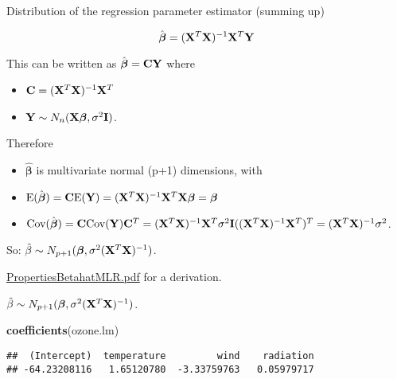 \documentclass[ignorenonframetext,]{beamer}
\newenvironment{Shaded}{\begin{snugshade}}{\end{snugshade}}
\newcommand{\KeywordTok}[1]{\textcolor[rgb]{0.13,0.29,0.53}{\textbf{#1}}}
\newcommand{\NormalTok}[1]{#1}
\providecommand{\tightlist}{%
  \setlength{\itemsep}{0pt}\setlength{\parskip}{0pt}}
\begin{document}
\begin{frame}[fragile]

\begin{block}{Distribution of the regression parameter estimator
(summing up)}

\[ \hat{\boldsymbol\beta}=({\bf X}^T{\bf X})^{-1} {\bf X}^T {\bf Y}\]

This can be written as \(\hat{\boldsymbol\beta}={\bf C}{\bf Y}\) where

\begin{itemize}
\tightlist
\item
  \({\bf C}=({\bf X}^T{\bf X})^{-1} {\bf X}^T\)
\item
  \({\bf Y} \sim N_{n}({\bf X} {\boldsymbol\beta},\sigma^2 {\bf I})\).
\end{itemize}

Therefore

\begin{itemize}
\tightlist
\item
  \(\hat{\boldsymbol\beta}\) is multivariate normal (p+1) dimensions,
  with
\item
  \(\text{E}(\hat{\boldsymbol\beta})={\bf C}\text{E}({\bf Y})=({\bf X}^T{\bf X})^{-1} {\bf X}^T{\bf X} {\boldsymbol\beta}={\boldsymbol\beta}\)
\item
  \(\text{Cov}(\hat{\boldsymbol\beta})={\bf C}\text{Cov}({\bf Y}){\bf C}^T=({\bf X}^T{\bf X})^{-1} {\bf X}^T \sigma^2 {\bf I}(({\bf X}^T{\bf X})^{-1} {\bf X}^T)^T =({\bf X}^T{\bf X})^{-1} \sigma^2\).
\end{itemize}

So:
\(\hat{\beta}\sim N_{p+1}(\boldsymbol{\beta},\sigma^2({\bf X}^T{\bf X})^{-1})\).

\end{block}

\begin{block}{\href{https://www.math.ntnu.no/emner/TMA4268/2018v/notes/PropertiesBetahatMLR.pdf}{PropertiesBetahatMLR.pdf}
for a derivation.}

\(\hat{\beta}\sim N_{p+1}(\boldsymbol{\beta},\sigma^2({\bf X}^T{\bf X})^{-1})\).

\footnotesize

\begin{Shaded}
\begin{Highlighting}[]
\KeywordTok{coefficients}\NormalTok{(ozone.lm)}
\end{Highlighting}
\end{Shaded}

\begin{verbatim}
##  (Intercept)  temperature         wind    radiation 
## -64.23208116   1.65120780  -3.33759763   0.05979717
\end{verbatim}


\end{block}
\end{frame}
\end{document}
